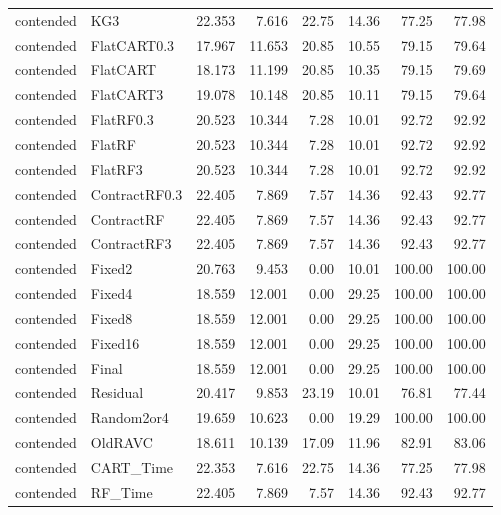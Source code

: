 \begin{longtable}{@{}llrrrrrr@{}}
contended & KG3 & 22.353 & 7.616 & 22.75 & 14.36 & 77.25 & 77.98\\
contended & FlatCART0.3 & 17.967 & 11.653 & 20.85 & 10.55 & 79.15 & 79.64\\
contended & FlatCART & 18.173 & 11.199 & 20.85 & 10.35 & 79.15 & 79.69\\
contended & FlatCART3 & 19.078 & 10.148 & 20.85 & 10.11 & 79.15 & 79.64\\
contended & FlatRF0.3 & 20.523 & 10.344 & 7.28 & 10.01 & 92.72 & 92.92\\
contended & FlatRF & 20.523 & 10.344 & 7.28 & 10.01 & 92.72 & 92.92\\
contended & FlatRF3 & 20.523 & 10.344 & 7.28 & 10.01 & 92.72 & 92.92\\
contended & ContractRF0.3 & 22.405 & 7.869 & 7.57 & 14.36 & 92.43 & 92.77\\
contended & ContractRF & 22.405 & 7.869 & 7.57 & 14.36 & 92.43 & 92.77\\
contended & ContractRF3 & 22.405 & 7.869 & 7.57 & 14.36 & 92.43 & 92.77\\
contended & Fixed2 & 20.763 & 9.453 & 0.00 & 10.01 & 100.00 & 100.00\\
contended & Fixed4 & 18.559 & 12.001 & 0.00 & 29.25 & 100.00 & 100.00\\
contended & Fixed8 & 18.559 & 12.001 & 0.00 & 29.25 & 100.00 & 100.00\\
contended & Fixed16 & 18.559 & 12.001 & 0.00 & 29.25 & 100.00 & 100.00\\
contended & Final & 18.559 & 12.001 & 0.00 & 29.25 & 100.00 & 100.00\\
contended & Residual & 20.417 & 9.853 & 23.19 & 10.01 & 76.81 & 77.44\\
contended & Random2or4 & 19.659 & 10.623 & 0.00 & 19.29 & 100.00 & 100.00\\
contended & OldRAVC & 18.611 & 10.139 & 17.09 & 11.96 & 82.91 & 83.06\\
contended & CART\_Time & 22.353 & 7.616 & 22.75 & 14.36 & 77.25 & 77.98\\
contended & RF\_Time & 22.405 & 7.869 & 7.57 & 14.36 & 92.43 & 92.77\\
\bottomrule\end{longtable}\normalsize
